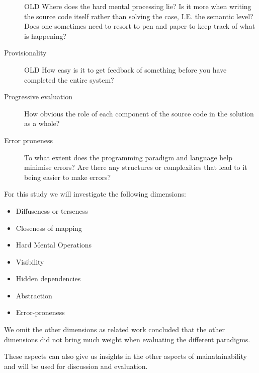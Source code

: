 \begin{description}
    OLD
Where does the hard mental processing lie? Is it more when writing the source
code itself rather than solving the case, I.E. the semantic level? Does one
sometimes need to resort to pen and paper to keep track of what is happening?

\item[ Provisionality ]

    OLD
How easy is it to get feedback of something before you have completed the entire
system?

\item[ Progressive evaluation ]

How obvious the role of each component of the source code in the solution as a
whole?

\item[ Error proneness ]

To what extent does the programming paradigm and language help minimise errors? Are
there any structures or complexities that lead to it being easier to make
errors?
\end{description}

\noindent For this study we will investigate the following dimensions: 

\begin{itemize}
    \item Diffuseness or terseness
    \item Closeness of mapping
    \item Hard Mental Operations
    \item Visibility
    \item Hidden dependencies
    \item Abstraction
    \item Error-proneness 
\end{itemize}

\noindent We omit the other dimensions as related work concluded that the other
dimensions did not bring much weight when evaluating the different
paradigms.~\cite{euguenkiss}

These aspects can also give us insights in the other aspects of mainatainability
and will be used for discussion and evaluation.
